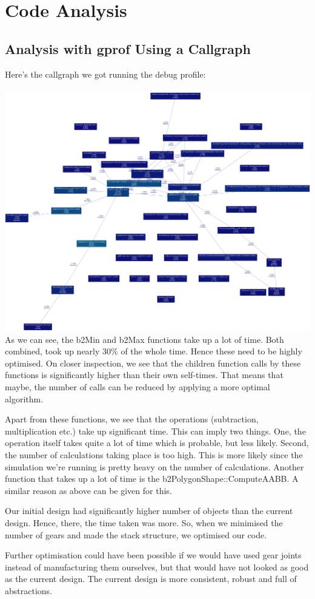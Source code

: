 \documentclass[12pt]{report}
\begin{document}
\chapter*{Code Analysis}
\section*{Analysis with gprof Using a Callgraph}
Here's the callgraph we got running the debug profile:
\\ \\
\includegraphics[scale=0.15]{./img/callgraph.png}
\\
As we can see, the b2Min and b2Max functions take up a lot of time. Both combined, took up nearly 30\% of the whole time. Hence these need to be highly optimised. On closer inspection, we see that the children function calls by these functions is significantly higher than their own self-times. That means that maybe, the number of calls can be reduced by applying a more optimal algorithm. 

Apart from these functions, we see that the operations (subtraction, multiplication etc.) take up significant time. This can imply two things. One, the operation itself takes quite a lot of time which is probable, but less likely. Second, the number of calculations taking place is too high. This is more likely since the simulation we're running is pretty heavy on the number of calculations. Another function that takes up a lot of time is the b2PolygonShape::ComputeAABB. A similar reason as above can be given for this.

Our initial design had significantly higher number of objects than the current design. Hence, there, the time taken was more. So, when we minimised the number of gears and made the stack structure, we optimised our code. 

Further optimisation could have been possible if we would have used gear joints instead of manufacturing them ourselves, but that would have not looked as good as the current design. The current design is more consistent, robust and full of abstractions.





\end{document}
